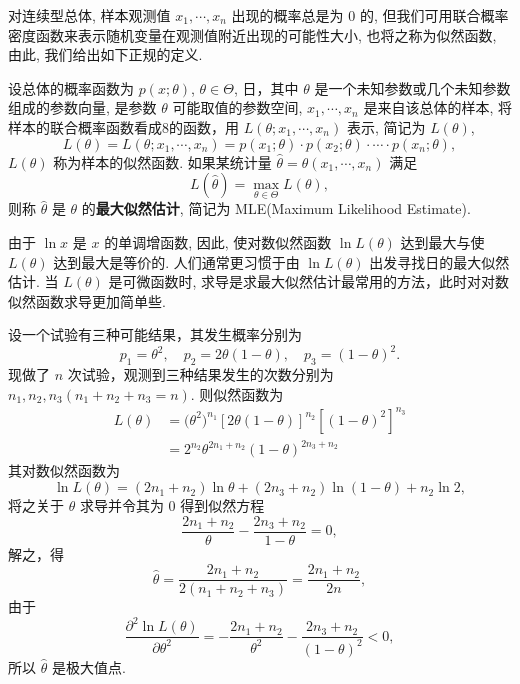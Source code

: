 对连续型总体, 样本观测值 $x_1,\cdots,x_n$ 出现的概率总是为 0 的, 但我们可用联合概率密度函数来表示随机变量在观测值附近出现的可能性大小, 也将之称为似然函数, 由此, 我们给出如下正规的定义.

\begin{definition}{}{}%
设总体的概率函数为 $p(x;\theta)$, $\theta\in\Theta$, 日，其中 $\theta$ 是一个未知参数或几个未知参数组成的参数向量, 是参数 $\theta$ 可能取值的参数空间, $x_1,\cdots,x_n$ 是来自该总体的样本, 将样本的联合概率函数看成8的函数，用 $L(\theta;x_1,\cdots,x_n)$ 表示, 简记为 $L(\theta)$,
\begin{equation}\label{eq:6.1.6}
L(\theta)=L(\theta;x_1,\cdots,x_n)=p(x_1;\theta)\cdot p(x_2;\theta)\cdot \cdots \cdot p(x_n;\theta),
\end{equation}
$L(\theta)$ 称为样本的似然函数. 如果某统计量 $\hat{\theta}=\hat{\theta}(x_1,\cdots,x_n)$ 满足
\begin{equation}\label{eq:6.1.7}
L(\hat{\theta})=\max_{\theta\in\Theta}L(\theta),
\end{equation}
则称 $\hat{\theta}$ 是 $\theta$ 的\textbf{最大似然估计}, 简记为 MLE(Maximum Likelihood Estimate).
\end{definition}

由于 $\ln x$ 是 $x$ 的单调增函数, 因此, 使对数似然函数 $\ln L(\theta)$ 达到最大与使 $L(\theta)$ 达到最大是等价的. 人们通常更习惯于由 $\ln L(\theta)$ 出发寻找日的最大似然估计. 当 $L(\theta)$ 是可微函数时, 求导是求最大似然估计最常用的方法，此时对对数似然函数求导更加简单些.

\begin{example}
设一个试验有三种可能结果，其发生概率分别为
\begin{equation}\label{eq:6.1.8}
p_1=\theta^2,\quad p_2=2\theta(1-\theta),\quad p_3=(1-\theta)^2.
\end{equation}
现做了 $n$ 次试验，观测到三种结果发生的次数分别为 $n_1,n_2,n_3(n_1+n_2+n_3=n)$. 则似然函数为
\begin{align*}
L(\theta) 
&=\big(\theta^{2}\big)^{n_1}[2 \theta(1-\theta)]^{n_{2}}\left[(1-\theta)^{2}\right]^{n_{3}} \\ &=2^{n_{2}} \theta^{2 n_{1}+n_{2}}(1-\theta)^{2 n_{3}+n_{2}}
\end{align*}
其对数似然函数为
\[\ln L(\theta)=\left(2 n_{1}+n_{2}\right)\ln\theta+\left(2 n_{3}+n_{2}\right)\ln (1-\theta)+n_{2}\ln 2,\]
将之关于 $\theta$ 求导并令其为 0 得到似然方程
\[\frac{2 n_{1}+n_{2}}{\theta}-\frac{2 n_{3}+n_{2}}{1-\theta}=0,\]
解之，得
\[\hat{\theta}=\frac{2 n_{1}+n_{2}}{2\left(n_{1}+n_{2}+n_{3}\right)}=\frac{2 n_{1}+n_{2}}{2 n},\]
由于
\[\frac{\partial^{2} \ln L(\theta)}{\partial \theta^{2}}=-\frac{2 n_{1}+n_{2}}{\theta^{2}}-\frac{2 n_{3}+n_{2}}{(1-\theta)^{2}}<0,\]
所以 $\hat{\theta}$ 是极大值点.
\end{example}

